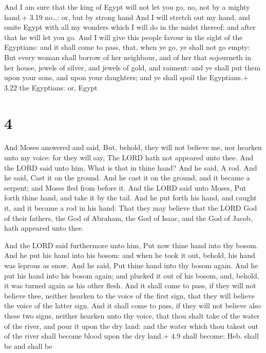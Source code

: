  And I am sure that the king of Egypt will not let you
go, no, not by a mighty hand.+ 3.19 no\ldots: or, but by strong hand
 And I will stretch out my hand, and smite Egypt with all
my wonders which I will do in the midst thereof: and after that he will
let you go.  And I will give this people favour in the
sight of the Egyptians: and it shall come to pass, that, when ye go, ye
shall not go empty:  But every woman shall borrow of her
neighbour, and of her that sojourneth in her house, jewels of silver,
and jewels of gold, and raiment: and ye shall put them upon your sons,
and upon your daughters; and ye shall spoil the Egyptians.+ 3.22 the
Egyptians: or, Egypt

\hypertarget{section-3}{%
\section{4}\label{section-3}}

 And Moses answered and said, But, behold, they will not
believe me, nor hearken unto my voice: for they will say, The LORD hath
not appeared unto thee.  And the LORD said unto him, What is
that in thine hand? And he said, A rod.  And he said, Cast
it on the ground. And he cast it on the ground, and it became a serpent;
and Moses fled from before it.  And the LORD said unto
Moses, Put forth thine hand, and take it by the tail. And he put forth
his hand, and caught it, and it became a rod in his hand: 
That they may believe that the LORD God of their fathers, the God of
Abraham, the God of Isaac, and the God of Jacob, hath appeared unto
thee.

 And the LORD said furthermore unto him, Put now thine
hand into thy bosom. And he put his hand into his bosom: and when he
took it out, behold, his hand was leprous as snow.  And he
said, Put thine hand into thy bosom again. And he put his hand into his
bosom again; and plucked it out of his bosom, and, behold, it was turned
again as his other flesh.  And it shall come to pass, if
they will not believe thee, neither hearken to the voice of the first
sign, that they will believe the voice of the latter sign. 
And it shall come to pass, if they will not believe also these two
signs, neither hearken unto thy voice, that thou shalt take of the water
of the river, and pour it upon the dry land: and the water which thou
takest out of the river shall become blood upon the dry land.+ 4.9 shall
become: Heb. shall be and shall be


